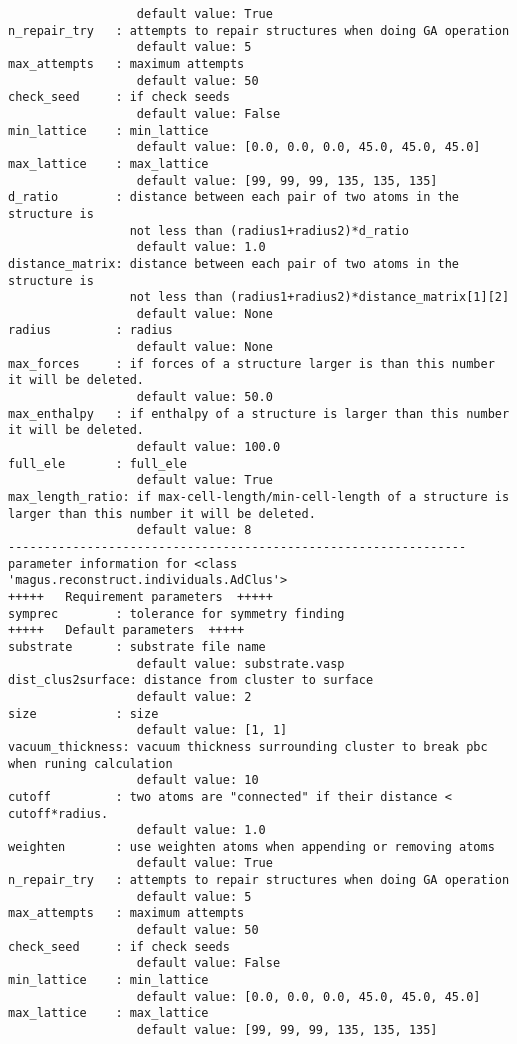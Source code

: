\documentclass[12pt,oneside]{book}
\begin{document}
\begin{tcolorbox}
\begin{verbatim}
                  default value: True
n_repair_try   : attempts to repair structures when doing GA operation
                  default value: 5
max_attempts   : maximum attempts
                  default value: 50
check_seed     : if check seeds
                  default value: False
min_lattice    : min_lattice
                  default value: [0.0, 0.0, 0.0, 45.0, 45.0, 45.0]
max_lattice    : max_lattice
                  default value: [99, 99, 99, 135, 135, 135]
d_ratio        : distance between each pair of two atoms in the structure is
                 not less than (radius1+radius2)*d_ratio
                  default value: 1.0
distance_matrix: distance between each pair of two atoms in the structure is
                 not less than (radius1+radius2)*distance_matrix[1][2]
                  default value: None
radius         : radius
                  default value: None
max_forces     : if forces of a structure larger is than this number it will be deleted.
                  default value: 50.0
max_enthalpy   : if enthalpy of a structure is larger than this number it will be deleted.
                  default value: 100.0
full_ele       : full_ele
                  default value: True
max_length_ratio: if max-cell-length/min-cell-length of a structure is larger than this number it will be deleted.
                  default value: 8
----------------------------------------------------------------
parameter information for <class 'magus.reconstruct.individuals.AdClus'>
+++++	Requirement parameters	+++++
symprec        : tolerance for symmetry finding
+++++	Default parameters	+++++
substrate      : substrate file name
                  default value: substrate.vasp
dist_clus2surface: distance from cluster to surface
                  default value: 2
size           : size
                  default value: [1, 1]
vacuum_thickness: vacuum thickness surrounding cluster to break pbc when runing calculation
                  default value: 10
cutoff         : two atoms are "connected" if their distance < cutoff*radius.
                  default value: 1.0
weighten       : use weighten atoms when appending or removing atoms
                  default value: True
n_repair_try   : attempts to repair structures when doing GA operation
                  default value: 5
max_attempts   : maximum attempts
                  default value: 50
check_seed     : if check seeds
                  default value: False
min_lattice    : min_lattice
                  default value: [0.0, 0.0, 0.0, 45.0, 45.0, 45.0]
max_lattice    : max_lattice
                  default value: [99, 99, 99, 135, 135, 135]

\end{verbatim}
\end{tcolorbox}
\end{document}
